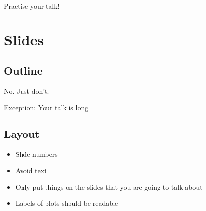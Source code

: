\documentclass{beamer}
\begin{document}
\begin{frame}{\insertsection}{\insertsubsection}
    Practise your talk!
\end{frame}


\section{Slides}

\subsection{Outline}
\begin{frame}{\insertsection}{\insertsubsection}
    No. Just don't.

    \pause
    Exception: Your talk is long
\end{frame}


\subsection{Layout}
\begin{frame}{\insertsection}{\insertsubsection}
    \begin{itemize}
        \item Slide numbers
        \item Avoid text
        \item Only put things on the slides that you are going to talk about
        \item Labels of plots should be readable
    \end{itemize}
\end{frame}
\end{document}
